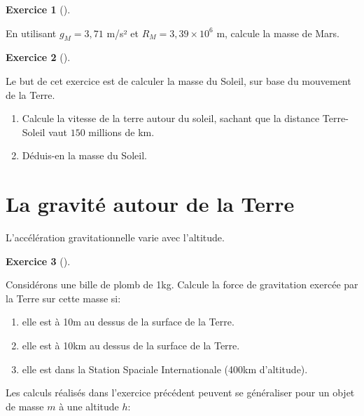 \documentclass[
  letterpaper,
  DIV=11,
  numbers=noendperiod]{scrartcl}
\providecommand{\tightlist}{%
  \setlength{\itemsep}{0pt}\setlength{\parskip}{0pt}}\usepackage{longtable,booktabs,array}
\theoremstyle{definition}
\newtheorem{exercise}{Exercice}[section]
\theoremstyle{definition}
\theoremstyle{definition}
\theoremstyle{remark}
\begin{document}
\begin{exercise}[]\protect\hypertarget{exr-masse-terre}{}\label{exr-masse-terre}

En utilisant \(g_M = 3,71\) m/s² et \(R_M = 3,39 \times 10^6\) m,
calcule la masse de Mars.

\end{exercise}

\begin{exercise}[]\protect\hypertarget{exr-masse-mars}{}\label{exr-masse-mars}

Le but de cet exercice est de calculer la masse du Soleil, sur base du
mouvement de la Terre.

\begin{enumerate}
\def\labelenumi{\arabic{enumi}.}
\tightlist
\item
  Calcule la vitesse de la terre autour du soleil, sachant que la
  distance Terre-Soleil vaut \(150\) millions de km.
\item
  Déduis-en la masse du Soleil.
\end{enumerate}

\end{exercise}

\section{La gravité autour de la
Terre}\label{la-gravituxe9-autour-de-la-terre}

L'accélération gravitationnelle varie avec l'altitude.

\begin{exercise}[]\protect\hypertarget{exr-alt}{}\label{exr-alt}

Considérons une bille de plomb de 1kg. Calcule la force de gravitation
exercée par la Terre sur cette masse si:

\begin{enumerate}
\def\labelenumi{\arabic{enumi}.}
\tightlist
\item
  elle est à 10m au dessus de la surface de la Terre.
\item
  elle est à 10km au dessus de la surface de la Terre.
\item
  elle est dans la Station Spaciale Internationale (400km d'altitude).
\end{enumerate}

\end{exercise}

Les calculs réalisés dans l'exercice précédent peuvent se généraliser
pour un objet de masse \(m\) à une altitude \(h\):
\end{document}
